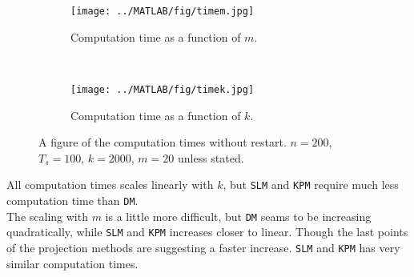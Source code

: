 \begin{figure}[H]
        \centering
        \begin{subfigure}[b]{0.45\textwidth}
                \texttt{[image: ../MATLAB/fig/timem.jpg]}
                \caption{ Computation time as a function of $m$. }
                \label{fig:timem}
        \end{subfigure}
        ~
        \begin{subfigure}[b]{0.45\textwidth}
                \texttt{[image: ../MATLAB/fig/timek.jpg]}
                \caption{ Computation time as a function of $k$. }
                \label{fig:timek}
        \end{subfigure}
        \caption{ A figure of the computation times without restart. $n = 200$, $T_s = 100$, $k = 2000$, $m = 20$ unless stated. }
        \label{fig:time0}
\end{figure}
\noindent All computation times scales linearly with $k$, but \texttt{SLM} and \texttt{KPM} require much less computation time than \texttt{DM}. \\
The scaling with $m$ is a little more difficult, but \texttt{DM} seams to be increasing quadratically, while \texttt{SLM} and \texttt{KPM} increases closer to linear. Though the last points of the projection methods are suggesting a faster increase. \texttt{SLM} and \texttt{KPM} has very similar computation times.
